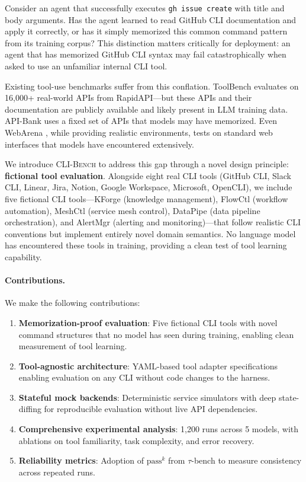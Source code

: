 \documentclass{article}
\newcommand{\clibench}{\textsc{CLI-Bench}}
\newcommand{\passmark}{\text{pass}^k}
\begin{document}
Consider an agent that successfully executes \texttt{gh issue create} with title and body arguments. Has the agent learned to read GitHub CLI documentation and apply it correctly, or has it simply memorized this common command pattern from its training corpus? This distinction matters critically for deployment: an agent that has memorized GitHub CLI syntax may fail catastrophically when asked to use an unfamiliar internal CLI tool.

Existing tool-use benchmarks suffer from this conflation. ToolBench \citep{toolbench2023} evaluates on 16,000+ real-world APIs from RapidAPI---but these APIs and their documentation are publicly available and likely present in LLM training data. API-Bank \citep{api-bank2023} uses a fixed set of APIs that models may have memorized. Even WebArena \citep{webarena2023}, while providing realistic environments, tests on standard web interfaces that models have encountered extensively.

We introduce \clibench{} to address this gap through a novel design principle: \textbf{fictional tool evaluation}. Alongside eight real CLI tools (GitHub CLI, Slack CLI, Linear, Jira, Notion, Google Workspace, Microsoft, OpenCLI), we include five fictional CLI tools---KForge (knowledge management), FlowCtl (workflow automation), MeshCtl (service mesh control), DataPipe (data pipeline orchestration), and AlertMgr (alerting and monitoring)---that follow realistic CLI conventions but implement entirely novel domain semantics. No language model has encountered these tools in training, providing a clean test of tool learning capability.

\paragraph{Contributions.} We make the following contributions:
\begin{enumerate}[leftmargin=*, itemsep=2pt, topsep=2pt]
    \item \textbf{Memorization-proof evaluation}: Five fictional CLI tools with novel command structures that no model has seen during training, enabling clean measurement of tool learning.
    \item \textbf{Tool-agnostic architecture}: YAML-based tool adapter specifications enabling evaluation on any CLI without code changes to the harness.
    \item \textbf{Stateful mock backends}: Deterministic service simulators with deep state-diffing for reproducible evaluation without live API dependencies.
    \item \textbf{Comprehensive experimental analysis}: 1,200 runs across 5 models, with ablations on tool familiarity, task complexity, and error recovery.
    \item \textbf{Reliability metrics}: Adoption of $\passmark$ from $\tau$-bench \citep{taubench2024} to measure consistency across repeated runs.
\end{enumerate}
\end{document}
